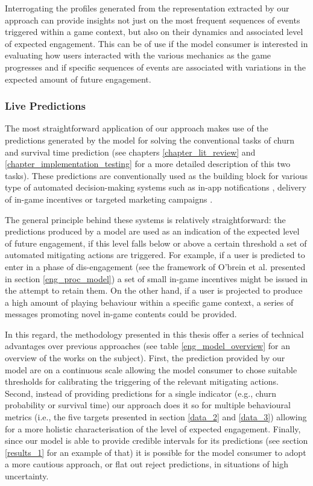 Interrogating the profiles generated from the representation extracted by our approach can provide insights not just on the most frequent sequences of events triggered within a game context, but also on their dynamics and associated level of expected engagement. This can be of use if the model consumer is interested in evaluating how users interacted with the various mechanics as the game progresses \cite{sifa2013behavior, makarovych2018like} and if specific sequences of events are associated with variations in the expected amount of future engagement. 

\subsubsection{Live Predictions}
The most straightforward application of our approach makes use of the predictions generated by the model for solving the conventional tasks of churn and survival time prediction (see chapters \ref{chapter_lit_review} and \ref{chapter_implementation_testing} for a more detailed description of this two tasks). These predictions are conventionally used as the building block for various type of automated decision-making systems such as in-app notifications \cite{milovsevic2017early}, delivery of in-game incentives or targeted marketing campaigns \cite{el2016game, el2021game}. 

The general principle behind these systems is relatively straightforward: the predictions produced by a model are used as an indication of the expected level of future engagement, if this level falls below or above a certain threshold a set of automated mitigating actions are triggered. For example, if a user is predicted to enter in a phase of dis-engagement (see the framework of O'brein et al. presented in section \ref{eng_proc_model}) a set of small in-game incentives might be issued in the attempt to retain them. On the other hand, if a user is projected to produce a high amount of playing behaviour within a specific game context, a series of messages promoting novel in-game contents could be provided.

In this regard, the methodology presented in this thesis offer a series of technical advantages over previous approaches (see table \ref{eng_model_overview} for an overview of the works on the subject). First, the prediction provided by our model are on a continuous scale allowing the model consumer to chose suitable thresholds for calibrating the triggering of the relevant mitigating actions. Second, instead of providing predictions for a single indicator (e.g., churn probability or survival time) our approach does it so for multiple behavioural metrics (i.e., the five targets presented in section \ref{data_2} and \ref{data_3}) allowing for a more holistic characterisation of the level of expected engagement. Finally, since our model is able to provide credible intervals for its predictions (see section \ref{results_1} for an example of that) it is possible for the model consumer to adopt a more cautious approach, or flat out reject predictions, in situations of high uncertainty.

